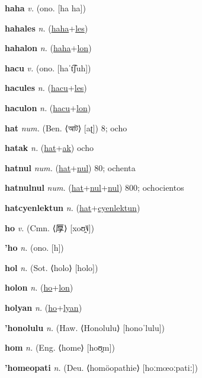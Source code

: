 \textbf{\hypertarget{haha}{haha}} \textit{v.} (ono. [ha ha])


\textbf{\hypertarget{hahales}{hahales}} \textit{n.} (\hyperlink{haha}{haha}+\allowbreak \hyperlink{les}{les})


\textbf{\hypertarget{hahalon}{hahalon}} \textit{n.} (\hyperlink{haha}{haha}+\allowbreak \hyperlink{lon}{lon})


\textbf{\hypertarget{hacu}{hacu}} \textit{v.} (ono. [haˈt͡ʃuh])


\textbf{\hypertarget{hacules}{hacules}} \textit{n.} (\hyperlink{hacu}{hacu}+\allowbreak \hyperlink{les}{les})


\textbf{\hypertarget{haculon}{haculon}} \textit{n.} (\hyperlink{hacu}{hacu}+\allowbreak \hyperlink{lon}{lon})


\textbf{\hypertarget{hat}{hat}} \textit{num.} (Ben. ⟨{\bengali{}আট}⟩ [aʈ])
8; ocho

\textbf{\hypertarget{hatak}{hatak}} \textit{n.} (\hyperlink{hat}{hat}+\allowbreak \hyperlink{ak}{ak})
ocho

\textbf{\hypertarget{hatnul}{hatnul}} \textit{num.} (\hyperlink{hat}{hat}+\allowbreak \hyperlink{nul}{nul})
80; ochenta

\textbf{\hypertarget{hatnulnul}{hatnulnul}} \textit{num.} (\hyperlink{hat}{hat}+\allowbreak \hyperlink{nul}{nul}+\allowbreak \hyperlink{nul}{nul})
800; ochocientos

\textbf{\hypertarget{hatcyenlektun}{hatcyenlektun}} \textit{n.} (\hyperlink{hat}{hat}+\allowbreak \hyperlink{cyenlektun}{cyenlektun})


\textbf{\hypertarget{ho}{ho}} \textit{v.} (Cmn. ⟨{\chinese{}厚}⟩ [xoʊ̯˥˩])


\textbf{\hypertarget{'ho}{'ho}} \textit{n.} (ono. [h])


\textbf{\hypertarget{hol}{hol}} \textit{n.} (Sot. ⟨holo⟩ [holo])


\textbf{\hypertarget{holon}{holon}} \textit{n.} (\hyperlink{ho}{ho}+\allowbreak \hyperlink{lon}{lon})


\textbf{\hypertarget{holyan}{holyan}} \textit{n.} (\hyperlink{ho}{ho}+\allowbreak \hyperlink{lyan}{lyan})


\textbf{\hypertarget{'honolulu}{'honolulu}} \textit{n.} (Haw. ⟨Honolulu⟩ [honoˈlulu])


\textbf{\hypertarget{hom}{hom}} \textit{n.} (Eng. ⟨home⟩ [hoʊ̯m])


\textbf{\hypertarget{'homeopati}{'homeopati}} \textit{n.} (Deu. ⟨homöopathie⟩ [hoːmœoːpatiː])


